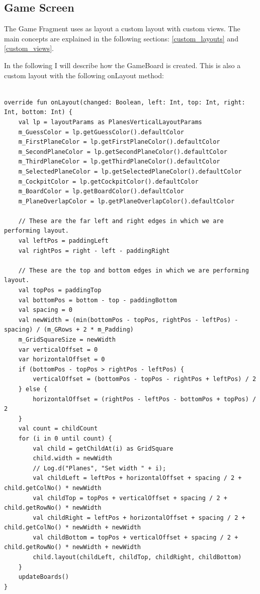 \subsection{Game Screen}

The Game Fragment uses as layout a custom layout with custom views. The main concepts are explained in the following sections: \ref{custom_layouts} and \ref{custom_views}.

In the following I will describe how the GameBoard is created. This is also a custom layout with the following onLayout method:

\begin{lstlisting}
	
override fun onLayout(changed: Boolean, left: Int, top: Int, right: Int, bottom: Int) {
	val lp = layoutParams as PlanesVerticalLayoutParams
	m_GuessColor = lp.getGuessColor().defaultColor
	m_FirstPlaneColor = lp.getFirstPlaneColor().defaultColor
	m_SecondPlaneColor = lp.getSecondPlaneColor().defaultColor
	m_ThirdPlaneColor = lp.getThirdPlaneColor().defaultColor
	m_SelectedPlaneColor = lp.getSelectedPlaneColor().defaultColor
	m_CockpitColor = lp.getCockpitColor().defaultColor
	m_BoardColor = lp.getBoardColor().defaultColor
	m_PlaneOverlapColor = lp.getPlaneOverlapColor().defaultColor
	
	// These are the far left and right edges in which we are performing layout.
	val leftPos = paddingLeft
	val rightPos = right - left - paddingRight
	
	// These are the top and bottom edges in which we are performing layout.
	val topPos = paddingTop
	val bottomPos = bottom - top - paddingBottom
	val spacing = 0
	val newWidth = (min(bottomPos - topPos, rightPos - leftPos) - spacing) / (m_GRows + 2 * m_Padding)
	m_GridSquareSize = newWidth
	var verticalOffset = 0
	var horizontalOffset = 0
	if (bottomPos - topPos > rightPos - leftPos) {
		verticalOffset = (bottomPos - topPos - rightPos + leftPos) / 2
	} else {
		horizontalOffset = (rightPos - leftPos - bottomPos + topPos) / 2
	}
	val count = childCount
	for (i in 0 until count) {
		val child = getChildAt(i) as GridSquare
		child.width = newWidth
		// Log.d("Planes", "Set width " + i);
		val childLeft = leftPos + horizontalOffset + spacing / 2 + child.getColNo() * newWidth
		val childTop = topPos + verticalOffset + spacing / 2 + child.getRowNo() * newWidth
		val childRight = leftPos + horizontalOffset + spacing / 2 + child.getColNo() * newWidth + newWidth
		val childBottom = topPos + verticalOffset + spacing / 2 + child.getRowNo() * newWidth + newWidth
		child.layout(childLeft, childTop, childRight, childBottom)
	}
	updateBoards()
}	
	
\end{lstlisting}

